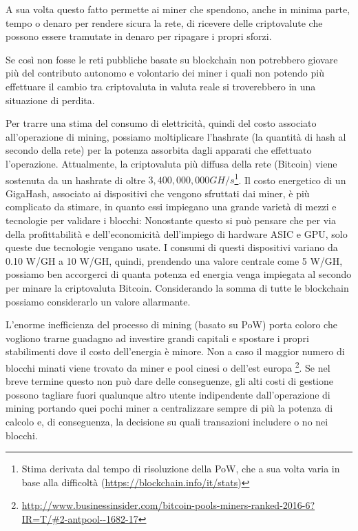 A sua volta questo fatto permette ai miner che spendono, anche in minima parte, tempo o denaro per rendere sicura la rete, di ricevere delle criptovalute che possono essere tramutate in denaro per ripagare i propri sforzi.

Se così non fosse le reti pubbliche basate su blockchain non potrebbero giovare più del contributo autonomo e volontario dei miner i quali non potendo più effettuare il cambio tra criptovaluta in valuta reale si troverebbero in una situazione di perdita. 

Per trarre una stima del consumo di elettricità, quindi del costo associato all'operazione di mining, possiamo moltiplicare l'hashrate (la quantità di hash al secondo della rete) per la potenza assorbita dagli apparati che effettuato l'operazione. Attualmente, la criptovaluta più diffusa della rete (Bitcoin) viene sostenuta da un hashrate di oltre $3,400,000,000 GH/s$\footnote{Stima derivata dal tempo di risoluzione della PoW, che a sua volta varia in base alla difficoltà (\url{https://blockchain.info/it/stats})}. Il costo energetico di un GigaHash, associato ai dispositivi che vengono sfruttati dai miner, è più complicato da stimare, in quanto essi impiegano una grande varietà di mezzi e tecnologie per validare i blocchi: Nonostante questo si può pensare che per via della profittabilità e dell'economicità dell'impiego di hardware ASIC e GPU, solo queste due tecnologie vengano usate. I consumi di questi dispositivi variano da 0.10 W/GH a 10 W/GH, quindi, prendendo una valore centrale come 5 W/GH, possiamo ben accorgerci di quanta potenza ed energia venga impiegata al secondo per minare la criptovaluta Bitcoin. Considerando la somma di tutte le blockchain possiamo considerarlo un valore allarmante.

L'enorme inefficienza del processo di mining (basato su PoW) porta coloro che vogliono trarne guadagno ad investire grandi capitali e spostare i propri stabilimenti dove il costo dell'energia è minore. Non a caso il maggior numero di blocchi minati viene trovato da miner e pool cinesi o dell'est europa \footnote{\url{http://www.businessinsider.com/bitcoin-pools-miners-ranked-2016-6?IR=T/\#2-antpool--1682-17}}. Se nel breve termine questo non può dare delle conseguenze, gli alti costi di gestione possono tagliare fuori qualunque altro utente indipendente dall'operazione di mining portando quei pochi miner a centralizzare sempre di più la potenza di calcolo e, di conseguenza, la decisione su quali transazioni includere o no nei blocchi.

